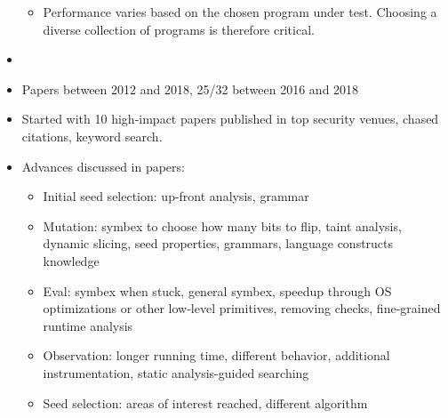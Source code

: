 \documentclass{article}
\begin{document}
\begin{itemize}
\begin{itemize}
              \item Performance varies based on the chosen program under test. Choosing a diverse collection of programs is therefore critical.
          \end{itemize}
    \item {}\cite{EvaluatingFuzzTesting}
    \item Papers between 2012 and 2018, 25/32 between 2016 and 2018
    \item Started with 10 high-impact papers published in top security venues, chased citations, keyword search.
    \item Advances discussed in papers:
          \begin{itemize}
              \item Initial seed selection: up-front analysis\cite{Skyfire, Orthrus, DIFUZE}, grammar\cite{QuickFuzz, QuickFuzz2}
              \item Mutation: symbex to choose how many bits to flip\cite{SYMFUZZ}, taint analysis\cite{Mayhem, Angora, Steelix, VUzzer}, dynamic slicing\cite{MutaGen}, seed properties\cite{SDF}, grammars\cite{SCADA, IMF}, language constructs knowledge\cite{Chizpurfle}
              \item Eval: symbex when stuck\cite{Driller, Mayhem}, general symbex\cite{S2F}, speedup through OS optimizations\cite{OS} or other low-level primitives\cite{IMF, VDF, kAFL}, removing checks\cite{TFuzz}, fine-grained runtime analysis\cite{MEDS}
              \item Observation: longer running time\cite{SlowFuzz}, different behavior\cite{NEZHA}, additional instrumentation\cite{Steelix, Angora}, static analysis-guided searching\cite{Dowser, VUzzer}
              \item Seed selection: areas of interest reached\cite{AFLGo, CGF, FairFuzz, VUzzer}, different algorithm\cite{SeedSelection, Scheduling}
          \end{itemize}
\end{itemize}






\pagebreak
\end{document}
